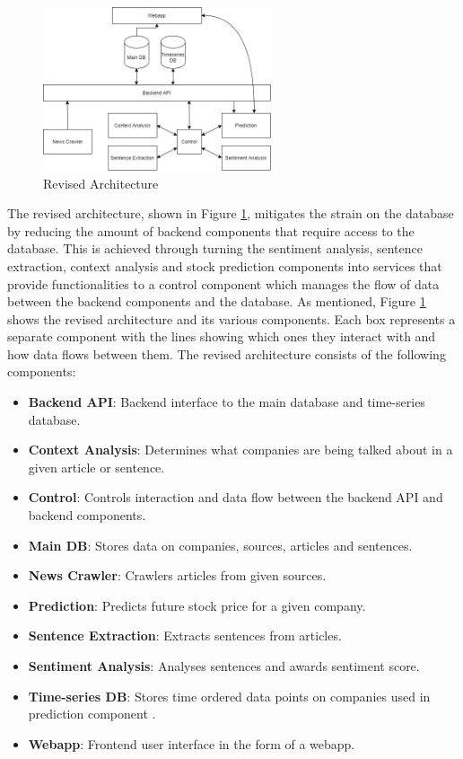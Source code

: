     \begin{figure}[!h]
        \centering
        \includegraphics[width=0.6\textwidth ]{images/upload/architecture_reviz.png}
        \caption{Revised Architecture}
        \label{fig:architecture_reviz}
    \end{figure}
    
    The revised architecture, shown in Figure \ref{fig:architecture_reviz}, mitigates the strain on the database by reducing the amount of backend components that require access to the database. This is achieved through turning the sentiment analysis, sentence extraction, context analysis and stock prediction components into services that provide functionalities to a control component which manages the flow of data between the backend components and the database. As mentioned, Figure \ref{fig:architecture_reviz} shows the revised architecture and its various components. Each box represents a separate component with the lines showing which ones they interact with and how data flows between them. The revised architecture consists of the following components:
   
    \begin{itemize}
        \item \textbf{Backend API}: Backend interface to the main database and time-series database.
        \item \textbf{Context Analysis}: Determines what companies are being talked about in a given article or sentence.
        \item \textbf{Control}: Controls interaction and data flow between the backend API and backend components. 
        \item \textbf{Main DB}: Stores data on companies, sources, articles and sentences.
        \item \textbf{News Crawler}: Crawlers articles from given sources.
        \item \textbf{Prediction}: Predicts future stock price for a given company.
        \item \textbf{Sentence Extraction}: Extracts sentences from articles.
        \item \textbf{Sentiment Analysis}: Analyses sentences and awards sentiment score.
        \item \textbf{Time-series DB}: Stores time ordered data points on companies used in prediction component .
        \item \textbf{Webapp}: Frontend user interface in the form of a webapp.
    \end{itemize}
    
